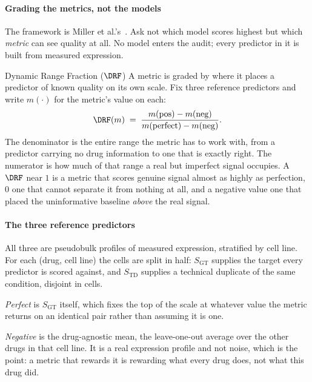 \paragraph{Grading the metrics, not the models} The framework is Miller
et al.'s~\cite{miller}. Ask not which model scores highest but which
\emph{metric} can see quality at all. No model enters the audit; every predictor
in it is built from measured expression.

\begin{defn}{Dynamic Range Fraction ($\DRF$)}
A metric is graded by where it places a predictor of known quality on its own
scale. Fix three reference predictors and write $m(\cdot)$ for the metric's value
on each:
\begin{equation}
 \DRF(m) \;=\; \frac{m(\textrm{pos}) - m(\textrm{neg})}%
 {m(\textrm{perfect}) - m(\textrm{neg})} .
\end{equation}
The denominator is the entire range the metric has to work with, from a predictor
carrying no drug information to one that is exactly right. The numerator is how
much of that range a real but imperfect signal occupies. A $\DRF$ near $1$ is a
metric that scores genuine signal almost as highly as perfection, $0$ one that
cannot separate it from nothing at all, and a negative value one that placed the
uninformative baseline \emph{above} the real signal.
\end{defn}

\paragraph{The three reference predictors} All three are pseudobulk profiles of
measured expression, stratified by cell line. For each (drug, cell line) the
cells are split in half: $S_{\textrm{GT}}$ supplies the target every predictor is
scored against, and $S_{\textrm{TD}}$ supplies a technical duplicate of the same
condition, disjoint in cells.

\emph{Perfect} is $S_{\textrm{GT}}$ itself, which fixes the top of the scale at
whatever value the metric returns on an identical pair rather than assuming it is
one.

\emph{Negative} is the drug-agnostic mean, the leave-one-out average over the
other drugs in that cell line. It is a real expression profile and not noise,
which is the point: a metric that rewards it is rewarding what every drug does,
not what this drug did.


